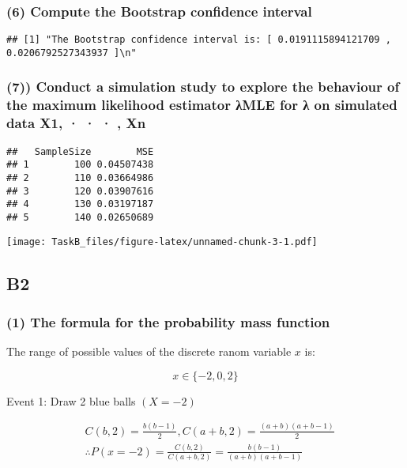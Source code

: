 \documentclass[
]{article}
\begin{document}
\subsubsection{(6) Compute the Bootstrap confidence
interval}\label{compute-the-bootstrap-confidence-interval}

\begin{verbatim}
## [1] "The Bootstrap confidence interval is: [ 0.0191115894121709 , 0.0206792527343937 ]\n"
\end{verbatim}

\subsubsection{(7)) Conduct a simulation study to explore the behaviour
of the maximum likelihood estimator λMLE for λ on simulated data X1, · ·
· ,
Xn}\label{conduct-a-simulation-study-to-explore-the-behaviour-of-the-maximum-likelihood-estimator-ux3bbmle-for-ux3bb-on-simulated-data-x1-xn}

\begin{verbatim}
##   SampleSize        MSE
## 1        100 0.04507438
## 2        110 0.03664986
## 3        120 0.03907616
## 4        130 0.03197187
## 5        140 0.02650689
\end{verbatim}

\texttt{[image: TaskB\_files/figure-latex/unnamed-chunk-3-1.pdf]}

\subsection{B2}\label{b2}

\subsubsection{(1) The formula for the probability mass
function}\label{the-formula-for-the-probability-mass-function}

The range of possible values of the discrete ranom variable \(x\) is:

\[
x \in\{-2,0,2\}
\]

Event 1: Draw 2 blue balls \((X=-2)\)

\[
\begin{aligned}
& C(b, 2)=\frac{b(b-1)}{2}, C(a+b, 2)=\frac{(a+b)(a+b-1)}{2} \\
& \therefore P(x=-2)=\frac{C(b, 2)}{C(a+b, 2)}=\frac{b(b-1)}{(a+b)(a+b-1)}
\end{aligned}
\]
\end{document}
